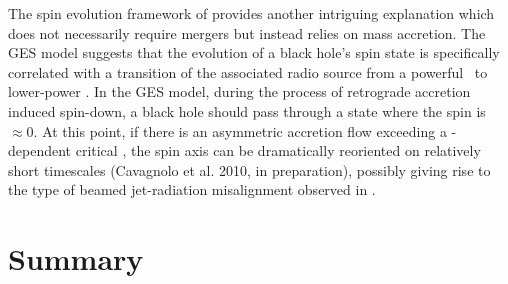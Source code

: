 \documentclass[useAMS,usenatbib]{mn2e}
\begin{document}
The spin evolution framework of \citet[][hereafter GES]{gesspin}
provides another intriguing explanation which does not necessarily
require mergers but instead relies on mass accretion. The GES model
suggests that the evolution of a black hole's spin state is
specifically correlated with a transition of the associated radio
source from a powerful \frii\ to lower-power \fri. In the GES model,
during the process of retrograde accretion induced spin-down, a black
hole should pass through a state where the spin is $\approx 0$. At
this point, if there is an asymmetric accretion flow exceeding a
\mbh-dependent critical \dmacc, the spin axis can be dramatically
reoriented on relatively short timescales (Cavagnolo et al. 2010, in
preparation), possibly giving rise to the type of beamed jet-radiation
misalignment observed in \irs.

\section{Summary}
\label{sec:summ}
\end{document}
